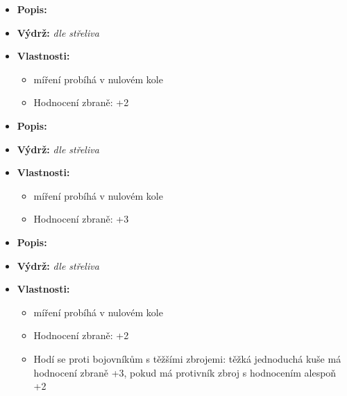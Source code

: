 \documentclass[../main.tex]{subfiles}
\begin{document}
\begin{predmet}
\begin{itemize}
	\item \textbf{Popis:} 
	\item \textbf{Výdrž:} \emph{dle střeliva}
	\item \textbf{Vlastnosti:}
	\begin{itemize}
		\item míření probíhá v nulovém kole
		\item Hodnocení zbraně: +2 
	\end{itemize}
\end{itemize}
\end{predmet}

\begin{predmet}
\begin{itemize}
	\item \textbf{Popis:} 
	\item \textbf{Výdrž:} \emph{dle střeliva}
	\item \textbf{Vlastnosti:}
		\begin{itemize}
			\item míření probíhá v nulovém kole
			\item Hodnocení zbraně: +3
		\end{itemize}
\end{itemize}
\end{predmet}

\begin{predmet}
\begin{itemize}
	\item \textbf{Popis:} 
	\item \textbf{Výdrž:} \emph{dle střeliva}
	\item \textbf{Vlastnosti:}
		\begin{itemize}
			\item míření probíhá v nulovém kole
			\item Hodnocení zbraně: +2
			\item Hodí se proti bojovníkům s těžšími zbrojemi: těžká jednoduchá kuše má hodnocení zbraně +3, pokud má protivník zbroj s hodnocením alespoň +2
		\end{itemize}
\end{itemize}
\end{predmet}
\end{document}
